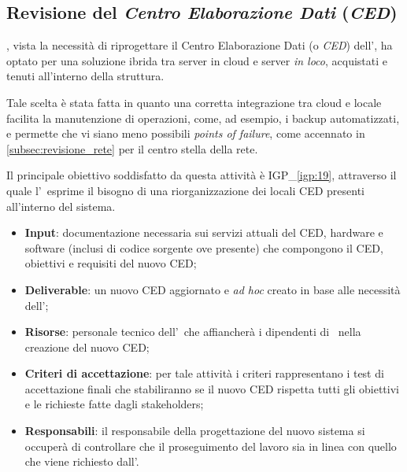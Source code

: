 	\subsection{Revisione del \textit{Centro Elaborazione Dati} (\textit{CED})}
		
		\azienda, vista la necessità di riprogettare il Centro Elaborazione Dati (o \textit{CED}) dell'\istituto, ha optato per una soluzione ibrida tra server in cloud e server \textit{in loco}, acquistati e tenuti all'interno della struttura.
		
		Tale scelta è stata fatta in quanto una corretta integrazione tra cloud e locale facilita la manutenzione di operazioni, come, ad esempio, i backup automatizzati, e permette che vi siano meno possibili \textit{points of failure}, come accennato in \ref{subsec:revisione_rete} per il centro stella della rete.
		
		Il principale obiettivo soddisfatto da questa attività è {\color{pantone}IGP\_\ref{igp:19}}, attraverso il quale l'\istituto~esprime il bisogno di una riorganizzazione dei locali CED presenti all'interno del sistema.
		
		\begin{itemize}[noitemsep]
			\renewcommand\labelitemi{--}
			\item \textbf{Input}: documentazione necessaria sui servizi attuali del CED, hardware e software (inclusi di codice sorgente ove presente) che compongono il CED, obiettivi e requisiti del nuovo CED;
			\item \textbf{Deliverable}: un nuovo CED aggiornato e \textit{ad hoc} creato in base alle necessità dell'\istituto;
			\item \textbf{Risorse}: personale tecnico dell'\istituto~che affiancherà i dipendenti di \azienda~nella creazione del nuovo CED;
			\item \textbf{Criteri di accettazione}: per tale attività i criteri rappresentano i test di accettazione finali che stabiliranno se il nuovo CED rispetta tutti gli obiettivi e le richieste fatte dagli stakeholders;
			\item \textbf{Responsabili}: il responsabile della progettazione del nuovo sistema si occuperà di controllare che il proseguimento del lavoro sia in linea con quello che viene richiesto dall'\istituto.
		\end{itemize}
		
